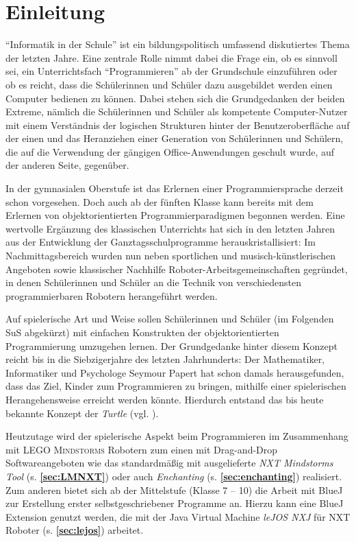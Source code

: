 \documentclass[paper=a4, DIV=calc, BCOR=12mm, twoside=on, onecolumn=on, open = right, titlepage =on, parskip =half-, headsepline = on, footsepline = off, chapterprefix = off, appendixprefix = on, fontsize = 12pt, numbers = noenddot, abstract = on]{scrbook}
\begin{document}
\chapter{Einleitung}
\label{sec:einleitung}
\onehalfspacing
"`Informatik in der Schule"' ist ein bildungspolitisch umfassend diskutiertes Thema der letzten Jahre. Eine zentrale Rolle nimmt dabei die Frage ein, ob es sinnvoll sei, ein Unterrichtsfach "`Programmieren"' ab der Grundschule einzuführen oder ob es reicht, dass die Schülerinnen und Schüler dazu ausgebildet werden einen Computer bedienen zu können. Dabei stehen sich die Grundgedanken der beiden Extreme, nämlich die Schülerinnen und Schüler als kompetente Computer-Nutzer mit einem Verständnis der logischen Strukturen hinter der Benutzeroberfläche auf der einen und das Heranziehen einer Generation von Schülerinnen und Schülern, die auf die Verwendung der gängigen Office-Anwendungen geschult wurde, auf der anderen Seite, gegenüber.

In der gymnasialen Oberstufe ist das Erlernen einer Programmiersprache derzeit schon vorgesehen. Doch auch ab der fünften Klasse kann bereits mit dem Erlernen von objektorientierten Programmierparadigmen begonnen werden. Eine wertvolle Ergänzung des klassischen Unterrichts hat sich in den letzten Jahren aus der Entwicklung der Ganztagsschulprogramme herauskristallisiert: Im Nachmittagsbereich wurden nun neben sportlichen und musisch-künstlerischen Angeboten sowie klassischer Nachhilfe Roboter-Arbeitsgemeinschaften gegründet, in denen Schülerinnen und Schüler an die Technik von verschiedensten programmierbaren Robotern herangeführt werden.

Auf spielerische Art und Weise sollen Schülerinnen und Schüler (im Folgenden SuS abgekürzt) mit einfachen Konstrukten der objektorientierten Programmierung umzugehen lernen. Der Grundgedanke hinter diesem Konzept reicht bis in die Siebzigerjahre des letzten Jahrhunderts: Der Mathematiker, Informatiker und Psychologe Seymour Papert hat schon damals herausgefunden, dass das Ziel, Kinder zum Programmieren zu bringen, mithilfe einer spielerischen Herangehensweise erreicht werden könnte. Hierdurch entstand das bis heute bekannte Konzept der \emph{Turtle} (vgl. \cite[S.365]{nievergelt:99}).

Heutzutage wird der spielerische Aspekt beim Programmieren im Zusammenhang mit \textsc{LEGO Mindstorms} Robotern zum einen mit Drag-and-Drop Softwareangeboten wie das standardmäßig mit ausgelieferte \emph{NXT Mindstorms Tool} (s.  \textbf{\ref{sec:LMNXT}}) oder auch \emph{Enchanting} (s. \textbf{\ref{sec:enchanting}}) realisiert. Zum anderen bietet sich ab der Mittelstufe (Klasse 7 -- 10) die Arbeit mit BlueJ zur Erstellung erster selbstgeschriebener Programme an. Hierzu kann eine BlueJ Extension genutzt werden, die mit der Java Virtual Machine \emph{leJOS NXJ} für NXT Roboter (s. \textbf{\ref{sec:lejos}}) arbeitet.
\end{document}
